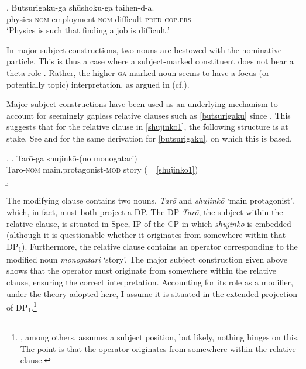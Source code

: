 \documentclass [output=book,colorlinks,citecolor=brown]{langscibook}
\begin{document}
\exg. Butsurigaku-ga shūshoku-ga taihen-d-a.\\
physics-\textsc{nom} employment-\textsc{nom} difficult-\textsc{pred-cop.prs}\\
`Physics is such that finding a job is difficult.’ \label{butsurigakudouble}

In major subject constructions, two nouns are bestowed with the nominative particle. This is thus a case where a subject-marked constituent does not bear a theta role \citep{heycock:1993:syntactic}. Rather, the higher \textsc{ga}-marked noun seems to have a focus (or potentially topic) interpretation, as argued in (cf.\citealt{vermeulen:2005:poss}).

Major subject constructions have been used as an underlying mechanism to account for seemingly gapless relative clauses such as \ref{butsurigaku} since \citet{kuroda:1992:japanese}. This suggests that for the relative clause in \ref{shujinko1}, the following structure is at stake. See \citet{heycock:1993:syntactic} and \citet{miyamoto:2017:RC} for the same derivation for \ref{butsurigaku}, on which this is based.

\newpage

\ex. \ag. Tarō-ga shujinkō-(no monogatari)\\
Taro-\textsc{nom} main.protagonist-\textsc{mod} story (= \ref{shujinko1})\\
\b. \hspace{-3.5cm} 

The modifying clause contains two nouns, \textit{Tarō} and \textit{shujinkō} `main protagonist’, which, in fact, must both project a DP. The DP \textit{Tarō}, the subject within the relative clause, is situated in Spec, IP of the CP in which \textit{shujinkō} is embedded (although it is questionable whether it originates from somewhere within that DP\textsubscript{1}). Furthermore, the relative clause contains an operator corresponding to the modified noun \textit{monogatari} `story’. The major subject construction given above shows that the operator must originate from somewhere within the relative clause, ensuring the correct interpretation. Accounting for its role as a modifier, under the theory adopted here, I assume it is situated in the extended projection of DP\textsubscript{1}.\footnote{\citet{miyamoto:2017:RC}, among others, assumes a subject position, but likely, nothing hinges on this. The point is that the operator originates from somewhere within the relative clause.} %
\end{document}
